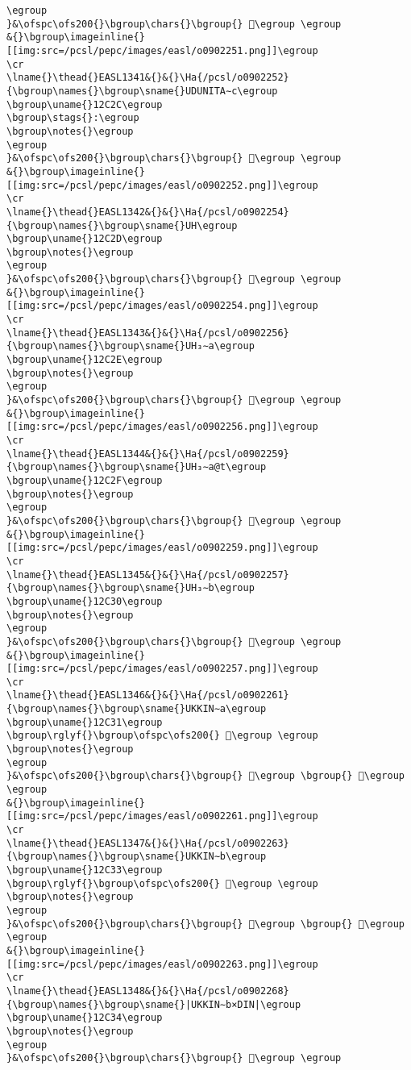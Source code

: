 \begin{verbatim}
\egroup
}&\ofspc\ofs200{}\bgroup\chars{}\bgroup{} 𒰫\egroup \egroup
&{}\bgroup\imageinline{}[[img:src=/pcsl/pepc/images/easl/o0902251.png]]\egroup
\cr
\lname{}\thead{}EASL1341&{}&{}\Ha{/pcsl/o0902252}{\bgroup\names{}\bgroup\sname{}UDUNITA∼c\egroup
\bgroup\uname{}12C2C\egroup
\bgroup\stags{}:\egroup
\bgroup\notes{}\egroup
\egroup
}&\ofspc\ofs200{}\bgroup\chars{}\bgroup{} 𒰬\egroup \egroup
&{}\bgroup\imageinline{}[[img:src=/pcsl/pepc/images/easl/o0902252.png]]\egroup
\cr
\lname{}\thead{}EASL1342&{}&{}\Ha{/pcsl/o0902254}{\bgroup\names{}\bgroup\sname{}UH\egroup
\bgroup\uname{}12C2D\egroup
\bgroup\notes{}\egroup
\egroup
}&\ofspc\ofs200{}\bgroup\chars{}\bgroup{} 𒰭\egroup \egroup
&{}\bgroup\imageinline{}[[img:src=/pcsl/pepc/images/easl/o0902254.png]]\egroup
\cr
\lname{}\thead{}EASL1343&{}&{}\Ha{/pcsl/o0902256}{\bgroup\names{}\bgroup\sname{}UH₃∼a\egroup
\bgroup\uname{}12C2E\egroup
\bgroup\notes{}\egroup
\egroup
}&\ofspc\ofs200{}\bgroup\chars{}\bgroup{} 𒰮\egroup \egroup
&{}\bgroup\imageinline{}[[img:src=/pcsl/pepc/images/easl/o0902256.png]]\egroup
\cr
\lname{}\thead{}EASL1344&{}&{}\Ha{/pcsl/o0902259}{\bgroup\names{}\bgroup\sname{}UH₃∼a@t\egroup
\bgroup\uname{}12C2F\egroup
\bgroup\notes{}\egroup
\egroup
}&\ofspc\ofs200{}\bgroup\chars{}\bgroup{} 𒰯\egroup \egroup
&{}\bgroup\imageinline{}[[img:src=/pcsl/pepc/images/easl/o0902259.png]]\egroup
\cr
\lname{}\thead{}EASL1345&{}&{}\Ha{/pcsl/o0902257}{\bgroup\names{}\bgroup\sname{}UH₃∼b\egroup
\bgroup\uname{}12C30\egroup
\bgroup\notes{}\egroup
\egroup
}&\ofspc\ofs200{}\bgroup\chars{}\bgroup{} 𒰰\egroup \egroup
&{}\bgroup\imageinline{}[[img:src=/pcsl/pepc/images/easl/o0902257.png]]\egroup
\cr
\lname{}\thead{}EASL1346&{}&{}\Ha{/pcsl/o0902261}{\bgroup\names{}\bgroup\sname{}UKKIN∼a\egroup
\bgroup\uname{}12C31\egroup
\bgroup\rglyf{}\bgroup\ofspc\ofs200{} 𒰱\egroup \egroup
\bgroup\notes{}\egroup
\egroup
}&\ofspc\ofs200{}\bgroup\chars{}\bgroup{} 𒰲\egroup \bgroup{} 𒰱\egroup \egroup
&{}\bgroup\imageinline{}[[img:src=/pcsl/pepc/images/easl/o0902261.png]]\egroup
\cr
\lname{}\thead{}EASL1347&{}&{}\Ha{/pcsl/o0902263}{\bgroup\names{}\bgroup\sname{}UKKIN∼b\egroup
\bgroup\uname{}12C33\egroup
\bgroup\rglyf{}\bgroup\ofspc\ofs200{} 𒰳\egroup \egroup
\bgroup\notes{}\egroup
\egroup
}&\ofspc\ofs200{}\bgroup\chars{}\bgroup{} 𒰼\egroup \bgroup{} 𒰳\egroup \egroup
&{}\bgroup\imageinline{}[[img:src=/pcsl/pepc/images/easl/o0902263.png]]\egroup
\cr
\lname{}\thead{}EASL1348&{}&{}\Ha{/pcsl/o0902268}{\bgroup\names{}\bgroup\sname{}|UKKIN∼b×DIN|\egroup
\bgroup\uname{}12C34\egroup
\bgroup\notes{}\egroup
\egroup
}&\ofspc\ofs200{}\bgroup\chars{}\bgroup{} 𒰴\egroup \egroup

\end{verbatim}
